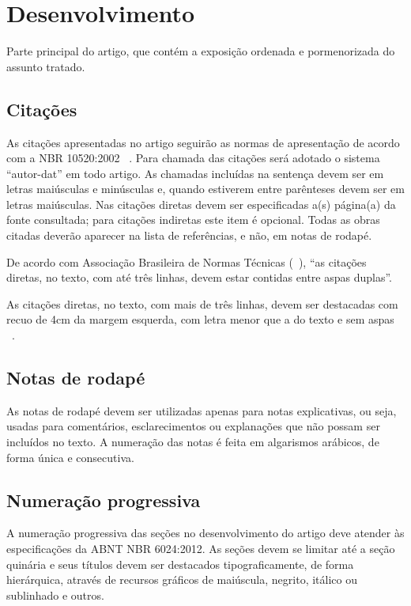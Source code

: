 \documentclass[article,a4paper,12pt,brazil,sumario=tradicional]{abntex2}
\renewenvironment{quotation}
  {\small\list{}{\rightmargin=0cm \leftmargin=2cm}%
   \item\relax}
  {\endlist}
\begin{document}
\section{Desenvolvimento}

Parte principal do artigo, que contém a exposição ordenada e pormenorizada do assunto tratado. 

\subsection{Citações}

As citações apresentadas no artigo seguirão as normas de apresentação de acordo com a NBR 10520:2002 ~\cite{bibliografica6023}. Para chamada das citações será adotado o sistema ``autor-dat'' em todo artigo. As chamadas incluídas na sentença devem ser em letras maiúsculas e minúsculas e, quando estiverem entre parênteses devem ser em letras maiúsculas. Nas citações diretas devem ser especificadas a(s) página(a) da fonte consultada; para citações indiretas este item é opcional. Todas as obras citadas deverão aparecer na lista de referências, e não, em notas de rodapé.

De acordo com Associação Brasileira de Normas Técnicas (~\citeyear{bibliografica6023}), ``as citações diretas, no texto, com até três linhas, devem estar contidas entre aspas duplas''.

\begin{quotation}
\noindent
As citações diretas, no texto, com mais de três linhas, devem ser destacadas com recuo de 4cm da margem esquerda, com letra menor que a do texto e sem aspas ~\cite{bibliografica6023}.
\end{quotation}

\subsection{Notas de rodapé}

As notas de rodapé devem ser utilizadas apenas para notas explicativas, ou seja, usadas para comentários, esclarecimentos ou explanações que não possam ser incluídos no texto. A numeração das notas é feita em algarismos arábicos, de forma única e consecutiva.

\subsection{Numeração progressiva}

A numeração progressiva das seções no desenvolvimento do artigo deve atender às especificações da ABNT NBR 6024:2012. As seções devem se limitar até a seção quinária e seus títulos devem ser destacados tipograficamente, de forma hierárquica, através de recursos gráficos de maiúscula, negrito, itálico ou sublinhado e outros.
\end{document}
